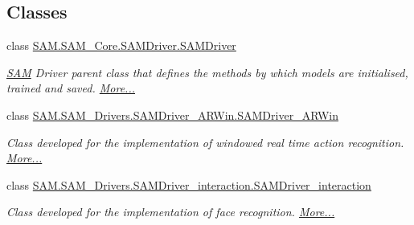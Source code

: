 \subsection*{Classes}
\begin{DoxyCompactItemize}
\item 
class \hyperlink{group__icubclient__SAM__Drivers_classSAM_1_1SAM__Core_1_1SAMDriver_1_1SAMDriver}{S\+A\+M.\+S\+A\+M\+\_\+\+Core.\+S\+A\+M\+Driver.\+S\+A\+M\+Driver}
\begin{DoxyCompactList}\small\item\em \hyperlink{namespaceSAM}{S\+AM} Driver parent class that defines the methods by which models are initialised, trained and saved.  \hyperlink{group__icubclient__SAM__Drivers_classSAM_1_1SAM__Core_1_1SAMDriver_1_1SAMDriver}{More...}\end{DoxyCompactList}\item 
class \hyperlink{group__icubclient__SAM__Drivers_classSAM_1_1SAM__Drivers_1_1SAMDriver__ARWin_1_1SAMDriver__ARWin}{S\+A\+M.\+S\+A\+M\+\_\+\+Drivers.\+S\+A\+M\+Driver\+\_\+\+A\+R\+Win.\+S\+A\+M\+Driver\+\_\+\+A\+R\+Win}
\begin{DoxyCompactList}\small\item\em Class developed for the implementation of windowed real time action recognition.  \hyperlink{group__icubclient__SAM__Drivers_classSAM_1_1SAM__Drivers_1_1SAMDriver__ARWin_1_1SAMDriver__ARWin}{More...}\end{DoxyCompactList}\item 
class \hyperlink{group__icubclient__SAM__Drivers_classSAM_1_1SAM__Drivers_1_1SAMDriver__interaction_1_1SAMDriver__interaction}{S\+A\+M.\+S\+A\+M\+\_\+\+Drivers.\+S\+A\+M\+Driver\+\_\+interaction.\+S\+A\+M\+Driver\+\_\+interaction}
\begin{DoxyCompactList}\small\item\em Class developed for the implementation of face recognition.  \hyperlink{group__icubclient__SAM__Drivers_classSAM_1_1SAM__Drivers_1_1SAMDriver__interaction_1_1SAMDriver__interaction}{More...}\end{DoxyCompactList}\end{DoxyCompactItemize}

